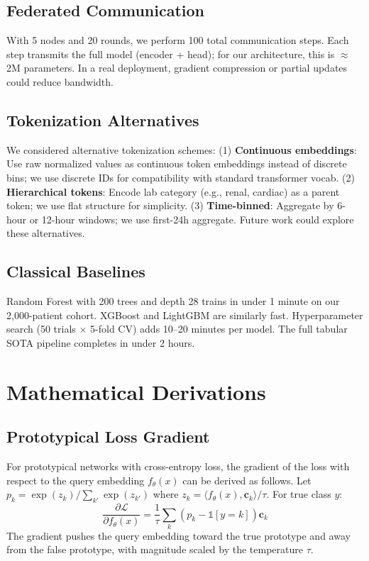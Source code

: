 \subsection{Federated Communication}

With 5 nodes and 20 rounds, we perform 100 total communication steps. Each step transmits the full model (encoder + head); for our architecture, this is $\approx$2M parameters. In a real deployment, gradient compression or partial updates could reduce bandwidth.

\subsection{Tokenization Alternatives}

We considered alternative tokenization schemes: (1) \textbf{Continuous embeddings}: Use raw normalized values as continuous token embeddings instead of discrete bins; we use discrete IDs for compatibility with standard transformer vocab. (2) \textbf{Hierarchical tokens}: Encode lab category (e.g., renal, cardiac) as a parent token; we use flat structure for simplicity. (3) \textbf{Time-binned}: Aggregate by 6-hour or 12-hour windows; we use first-24h aggregate. Future work could explore these alternatives.

\subsection{Classical Baselines}

Random Forest with 200 trees and depth 28 trains in under 1 minute on our 2,000-patient cohort. XGBoost and LightGBM are similarly fast. Hyperparameter search (50 trials $\times$ 5-fold CV) adds 10--20 minutes per model. The full tabular SOTA pipeline completes in under 2 hours.

\section{Mathematical Derivations}

\subsection{Prototypical Loss Gradient}

For prototypical networks with cross-entropy loss, the gradient of the loss with respect to the query embedding $f_\theta(x)$ can be derived as follows. Let $p_k = \exp(z_k) / \sum_{k'} \exp(z_{k'})$ where $z_k = \langle f_\theta(x), \mathbf{c}_k \rangle / \tau$. For true class $y$:
\begin{equation}
\frac{\partial \mathcal{L}}{\partial f_\theta(x)} = \frac{1}{\tau} \sum_k (p_k - \mathbb{1}[y=k]) \mathbf{c}_k
\end{equation}
The gradient pushes the query embedding toward the true prototype and away from the false prototype, with magnitude scaled by the temperature $\tau$.

